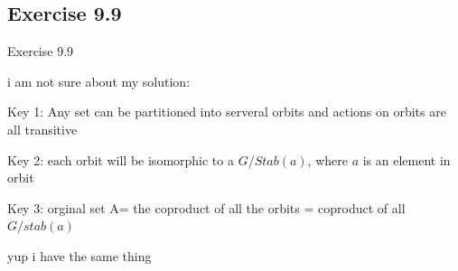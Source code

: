 \documentclass[15pt]{scrartcl}
\begin{document}
\subsection{Exercise 9.9}
\begin{discussion*}Exercise 9.9
    \begin{abboy*}
        i am not sure about my solution: 

        Key 1:  Any set can be partitioned into serveral orbits and actions on orbits are all transitive 

        Key 2: each orbit will be isomorphic to a $G/Stab(a)$, where $a$ is an element in orbit

        Key 3: orginal set A= the coproduct of all the orbits  = coproduct of all  $G/stab(a)$
    \end{abboy*}
    \begin{arthur*}
        yup i have the same thing
    \end{arthur*}
\end{discussion*}
\end{document}
